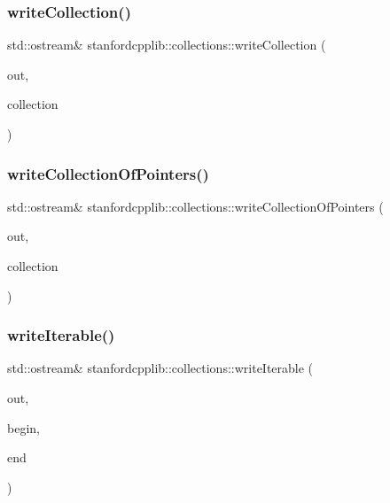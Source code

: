 \subsubsection{\texorpdfstring{write\+Collection()}{writeCollection()}}
{\footnotesize\ttfamily std\+::ostream\& stanfordcpplib\+::collections\+::write\+Collection (\begin{DoxyParamCaption}\item[{std\+::ostream \&}]{out,  }\item[{Collection\+Type}]{collection }\end{DoxyParamCaption})}

\mbox{\label{namespacestanfordcpplib_1_1collections_a0476c2f41f266287172ae36ba9a66266}} 
\subsubsection{\texorpdfstring{write\+Collection\+Of\+Pointers()}{writeCollectionOfPointers()}}
{\footnotesize\ttfamily std\+::ostream\& stanfordcpplib\+::collections\+::write\+Collection\+Of\+Pointers (\begin{DoxyParamCaption}\item[{std\+::ostream \&}]{out,  }\item[{Collection\+Type}]{collection }\end{DoxyParamCaption})}

\mbox{\label{namespacestanfordcpplib_1_1collections_ad5dc1381a951235f3246d586de1bffb9}} 
\subsubsection{\texorpdfstring{write\+Iterable()}{writeIterable()}}
{\footnotesize\ttfamily std\+::ostream\& stanfordcpplib\+::collections\+::write\+Iterable (\begin{DoxyParamCaption}\item[{std\+::ostream \&}]{out,  }\item[{Iterator\+Type}]{begin,  }\item[{Iterator\+Type}]{end }\end{DoxyParamCaption})}

